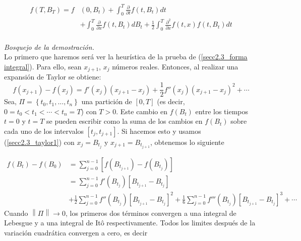 \documentclass[11pt,notitlepage]{article}
\begin{document}
\begin{align*}
    f(T,B_{T})=f&(0,B_{t})+\int_{0}^{T}\frac{\partial }{\partial t}f(t,B_{t})dt\\
                &+\int_{0}^{T}\frac{\partial }{\partial x}f(t,B_{t})dB_{t}+\frac{1}{2}\int_{0}^{T}\frac{\partial^{2}}{\partial x}f(t,x)f(t,B_{t})dt
\end{align*}
\\
\textit{Bosquejo de la demostración.}\\
Lo primero que haremos será ver la heurística de la prueba de (\ref{secc2.3_forma integral}). Para ello, sean $x_{j+1}$, $x_{j}$ números reales. Entonces, al realizar una expansión de Taylor se obtiene:
\begin{equation}\label{secc2.3_taylor1}
    f(x_{j+1})-f(x_{j}) = f'(x_{j})(x_{j+1}-x_{j})+\frac{1}{2}f''(x_{j})(x_{j+1}-x_{j})^{2}+ \cdots
\end{equation}
Sea, $\Pi=\left\{ t_{0},t_{1},...,t_{n} \right\}$ una partición de $[0,T]$ (es decir, $0=t_{0}<t_{1}<\cdots<t_{n}=T$) con $T>0$. Este cambio en $f(B_{t})$ entre los tiempos $t=0$ y $t=T$ se pueden escribir como la suma de los cambios en $f(B_{t})$ sobre cada uno de los intervalos $[t_{j},t_{j+1}]$. Si hacemos esto y usamos (\ref{secc2.3_taylor1}) con $x_{j}=B_{t_{j}}$ y $x_{j+1}=B_{t_{j+1}}$, obtenemos lo siguiente

\begin{align*}
    f(B_{t})-f(B_{0})&=\sum_{j=0}^{n-1}\left [ f(B_{t_{j+1}})-f(B_{t_{j}}) \right ]\\
    &=\sum_{j=0}^{n-1} f'(B_{t_{j}})\left [ B_{t_{j+1}}-B_{t_{j}} \right ]\\ &+ \frac{1}{2}\sum_{j=0}^{n-1} f''(B_{t_{j}})\left [ B_{t_{j+1}}-B_{t_{j}} \right ]^{2}+\frac{1}{6}\sum_{j=0}^{n-1} f'''(B_{t_{j}})\left [ B_{t_{j+1}}-B_{t_{j}} \right ]^{3}+\cdots
\end{align*}
Cuando $\left \| \Pi \right \| \rightarrow 0$, los primeros dos términos convergen a una integral de Lebesgue y a una integral de Itô respectivamente. Todos los limites después de la variación cuadrática convergen a cero, es decir
\end{document}

